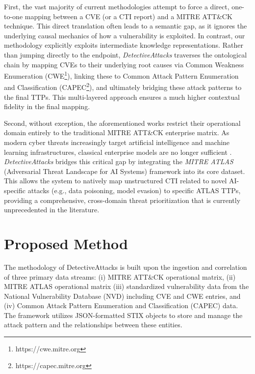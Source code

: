 \documentclass[conference]{IEEEtran}
\begin{document}
First, the vast majority of current methodologies attempt to force a direct, one-to-one mapping between a CVE (or a CTI report) and a MITRE ATT\&CK technique. This direct translation often leads to a semantic gap, as it ignores the underlying causal mechanics of how a vulnerability is exploited. In contrast, our methodology explicitly exploits intermediate knowledge representations. Rather than jumping directly to the endpoint, \textit{DetectiveAttacks} traverses the ontological chain by mapping CVEs to their underlying root causes via Common Weakness Enumeration (CWE\footnote{https://cwe.mitre.org}), linking these to Common Attack Pattern Enumeration and Classification (CAPEC\footnote{https://capec.mitre.org}), and ultimately bridging these attack patterns to the final TTPs. This multi-layered approach ensures a much higher contextual fidelity in the final mapping.

Second, without exception, the aforementioned works restrict their operational domain entirely to the traditional MITRE ATT\&CK enterprise matrix. As modern cyber threats increasingly target artificial intelligence and machine learning infrastructures, classical enterprise models are no longer sufficient \cite{Mohamed2025}. \textit{DetectiveAttacks} bridges this critical gap by integrating the \textit{MITRE ATLAS} (Adversarial Threat Landscape for AI Systems) framework into its core dataset. This allows the system to natively map unstructured CTI related to novel AI-specific attacks (e.g., data poisoning, model evasion) to specific ATLAS TTPs, providing a comprehensive, cross-domain threat prioritization that is currently unprecedented in the literature.

\section{Proposed Method}
\label{proposed_method}
The methodology of DetectiveAttacks is built upon the ingestion and correlation of three primary data streams: (i) MITRE ATT\&CK operational matrix, (ii) MITRE ATLAS operational matrix (iii) standardized vulnerability data from the National Vulnerability Database (NVD) including CVE and CWE entries, and (iv) Common Attack Pattern Enumeration and Classification (CAPEC) data. The framework utilizes JSON-formatted STIX objects to store and manage the attack pattern and the relationships between these entities.
\end{document}
